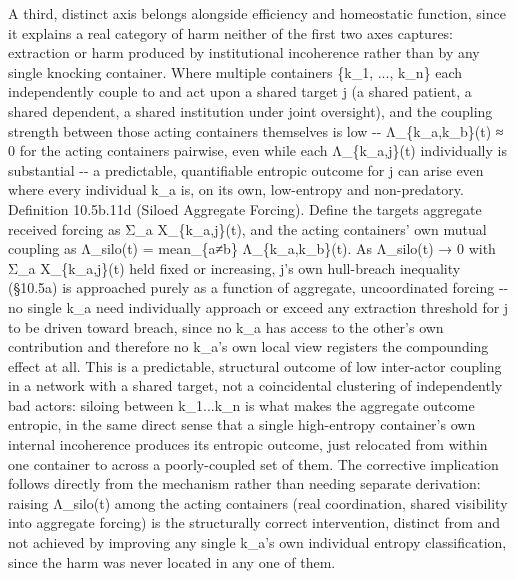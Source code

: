 \documentclass[
]{article}
\begin{document}
A third, distinct axis belongs alongside efficiency and homeostatic
function, since it explains a real category of harm neither of the first
two axes captures: extraction or harm produced by institutional
incoherence rather than by any single knocking container. Where multiple
containers \{k\_1, ..., k\_n\} each independently couple to and act upon
a shared target j (a shared patient, a shared dependent, a shared
institution under joint oversight), and the coupling strength between
those acting containers themselves is low -\/- Λ\_\{k\_a,k\_b\}(t) ≈ 0
for the acting containers pairwise, even while each Λ\_\{k\_a,j\}(t)
individually is substantial -\/- a predictable, quantifiable entropic
outcome for j can arise even where every individual k\_a is, on its own,
low-entropy and non-predatory. Definition 10.5b.11d (Siloed Aggregate
Forcing). Define the targets aggregate received forcing as Σ\_a
X\_\{k\_a,j\}(t), and the acting containers' own mutual coupling as
Λ\_silo(t) = mean\_\{a≠b\} Λ\_\{k\_a,k\_b\}(t). As Λ\_silo(t) → 0 with
Σ\_a X\_\{k\_a,j\}(t) held fixed or increasing, j's own hull-breach
inequality (§10.5a) is approached purely as a function of aggregate,
uncoordinated forcing -\/- no single k\_a need individually approach or
exceed any extraction threshold for j to be driven toward breach, since
no k\_a has access to the other's own contribution and therefore no
k\_a's own local view registers the compounding effect at all. This is a
predictable, structural outcome of low inter-actor coupling in a network
with a shared target, not a coincidental clustering of independently bad
actors: siloing between k\_1...k\_n is what makes the aggregate outcome
entropic, in the same direct sense that a single high-entropy
container's own internal incoherence produces its entropic outcome, just
relocated from within one container to across a poorly-coupled set of
them. The corrective implication follows directly from the mechanism
rather than needing separate derivation: raising Λ\_silo(t) among the
acting containers (real coordination, shared visibility into aggregate
forcing) is the structurally correct intervention, distinct from and not
achieved by improving any single k\_a's own individual entropy
classification, since the harm was never located in any one of them.
\end{document}
